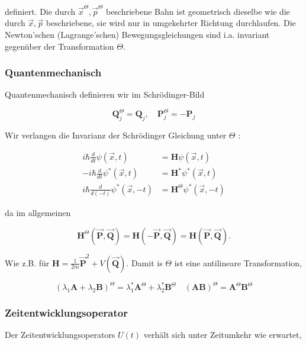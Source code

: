 \documentclass[10pt, letterpaper]{article}
\begin{document}
definiert. Die durch $\vec{x}^{\Theta}, \vec{p}^{\Theta}$ beschriebene Bahn ist geometrisch dieselbe wie die durch $\vec{x}, \vec{p}$ beschriebene, sie wird nur in umgekehrter Richtung durchlaufen. Die Newton'schen (Lagrange'schen) Bewegungsgleichungen sind i.a. invariant gegenüber der Transformation $\Theta$.







\subsubsection*{Quantenmechanisch}
Quantenmechanisch definieren wir im Schrödinger-Bild

$$
\mathbf{Q}_{j}^{\Theta}=\mathbf{Q}_{j}, \quad \mathbf{P}_{j}^{\Theta}=-\mathbf{P}_{j}
$$

Wir verlangen die Invarianz der Schrödinger Gleichung unter $\Theta$ :

$$
\begin{aligned}
i \hbar \frac{d}{d t} \psi(\vec{x}, t) & =\mathbf{H} \psi(\vec{x}, t) \\
-i \hbar \frac{d}{d t} \psi^{*}(\vec{x}, t) & =\mathbf{H}^{*} \psi^{*}(\vec{x}, t) \\
i \hbar \frac{d}{d(-t)} \psi^{*}(\vec{x},-t) & =\mathbf{H}^{\Theta} \psi^{*}(\vec{x},-t)
\end{aligned}
$$

da im allgemeinen

$$
\mathbf{H}^{\Theta}(\overrightarrow{\mathbf{P}}, \overrightarrow{\mathbf{Q}})=\mathbf{H}(-\overrightarrow{\mathbf{P}}, \overrightarrow{\mathbf{Q}})=\mathbf{H}(\overrightarrow{\mathbf{P}}, \overrightarrow{\mathbf{Q}}) .
$$

Wie z.B. für $\mathbf{H}=\frac{1}{2 m} \overrightarrow{\mathbf{P}}^{2}+V(\overrightarrow{\mathbf{Q}})$. Damit is $\Theta$ ist eine antilineare Transformation,

$$
\left(\lambda_{1} \mathbf{A}+\lambda_{2} \mathbf{B}\right)^{\Theta}=\lambda_{1}^{*} \mathbf{A}^{\Theta}+\lambda_{2}^{*} \mathbf{B}^{\Theta} \quad(\mathbf{A B})^{\Theta}=\mathbf{A}^{\Theta} \mathbf{B}^{\Theta}
$$

\subsubsection*{Zeitentwicklungsoperator}
Der Zeitentwicklungsoperators $U(t)$ verhält sich unter Zeitumkehr wie erwartet,
\end{document}
